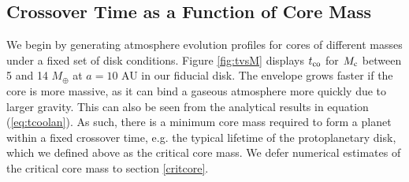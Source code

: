 \documentclass[apj]{emulateapj}
\begin{document}



\subsection{Crossover Time as a Function of Core Mass}
\label{Mct}

We begin by generating atmosphere evolution profiles for cores of different masses under a fixed set of disk conditions. Figure \ref{fig:tvsM} displays $t_{\rm{co}}$ for $M_{\rm c}$ between 5 and 14 $M_{\oplus}$ at $a=10$ AU in our fiducial disk. The envelope grows faster if the core is more massive, as it can bind a gaseous atmosphere more quickly due to larger gravity. This can also be seen from the analytical results in equation (\ref{eq:tcoolan}). As such, there is a minimum core mass required to form a planet within a fixed crossover time, e.g. the typical lifetime of the protoplanetary disk, which we defined above as the critical core mass. We defer numerical estimates of the critical core mass to section \ref{critcore}.

\end{document}
